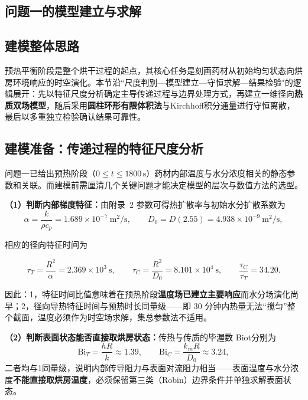 \begin{center}
    \section{问题一的模型建立与求解}
\end{center}

\subsection{建模整体思路}
预热平衡阶段是整个烘干过程的起点，其核心任务是刻画药材从初始均匀状态向烘房环境响应的时空演化。本节沿“尺度判别—模型建立—守恒求解—结果检验"的逻辑展开：先以特征尺度分析确定主导传递过程与边界处理方式，再建立一维径向\textbf{热质双场模型}，随后采用\textbf{圆柱环形有限体积法}与Kirchhoff积分通量进行守恒离散，最后以多重独立检验确认结果可靠性。


\subsection{建模准备：传递过程的特征尺度分析}

问题一已给出预热阶段（$0\le t\le 1800\,\mathrm{s}$）药材内部温度与水分浓度相关的静态参数和关联。而建模前需厘清几个关键问题才能决定模型的层次与数值方法的选型。

\textbf{（1）判断内部梯度特征：}由附录~2 参数可得热扩散率与初始水分扩散系数为
\begin{equation}\label{eq:q1-alpha}
\alpha=\frac{k}{\rho c_p}=1.689\times10^{-7}\ \mathrm{m^2/s},
\qquad
D_0=D(2.55)=4.938\times10^{-9}\ \mathrm{m^2/s},
\end{equation}

相应的径向特征时间为

\begin{equation}\label{eq:q1-tau}
\tau_T=\frac{R^2}{\alpha}=2.369\times10^{3}\ \mathrm{s},
\qquad
\tau_C=\frac{R^2}{D_0}=8.101\times10^{4}\ \mathrm{s},
\qquad
\frac{\tau_C}{\tau_T}=34.20.
\end{equation}


因此：1，特征时间比值意味着在预热阶段\textbf{温度场已建立主要响应}而水分场演化尚早；2，径向导热特征时间与预热时长同量级——即 $30$ 分钟内热量无法``搅匀''整个截面，温度必须作为时空场求解，集总参数法不适用。




\textbf{（2）判断表面状态能否直接取烘房状态：}传热与传质的毕渥数 Biot分别为
\[
\mathrm{Bi}_T=\frac{hR}{k}\approx1.39,\qquad
\mathrm{Bi}_C=\frac{k_mR}{D_0}\approx3.24,
\]
二者均与1同量级，说明内部传导阻力与表面对流阻力相当——表面温度与水分浓度\textbf{不能直接取烘房温度}，必须保留第三类（Robin）边界条件并单独求解表面状态。

